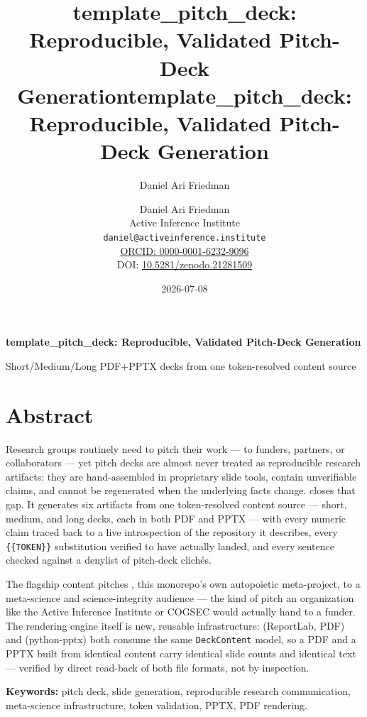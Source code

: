 \documentclass[
  english,
]{article}
\title{template\_pitch\_deck: Reproducible, Validated Pitch-Deck
Generation}
\author{Daniel Ari Friedman}
\date{}
\title{template\_pitch\_deck: Reproducible, Validated Pitch-Deck Generation}
\author{Daniel Ari Friedman\\\footnotesize{Active Inference Institute}\\\footnotesize{\texttt{daniel@activeinference.institute}}\\\footnotesize{\href{https://orcid.org/0000-0001-6232-9096}{ORCID: 0000-0001-6232-9096}} \\ \footnotesize{DOI: \href{https://doi.org/10.5281/zenodo.21281509}{10.5281/zenodo.21281509}}}
\date{2026-07-08}
\begin{document}
\begin{titlepage}
\centering
\vspace*{2cm}
{\LARGE\bfseries template\_pitch\_deck: Reproducible, Validated Pitch-Deck Generation\par}
\vspace{0.75em}
{\large Short/Medium/Long PDF+PPTX decks from one token-resolved content source\par}
\vfill
\makeatletter
{\@author\par}
\vspace{1em}
{\@date\par}
\makeatother
\vfill
\end{titlepage}
\thispagestyle{empty}
\tableofcontents
\newpage

\section{Abstract}\label{sec:abstract}

Research groups routinely need to pitch their work --- to funders,
partners, or collaborators --- yet pitch decks are almost never treated
as reproducible research artifacts: they are hand-assembled in
proprietary slide tools, contain unverifiable claims, and cannot be
regenerated when the underlying facts change.
 closes that gap. It generates six
artifacts from one token-resolved content source --- short, medium, and
long decks, each in both PDF and PPTX --- with every numeric claim
traced back to a live introspection of the repository it describes,
every \texttt{\{\{TOKEN\}\}} substitution verified to have actually
landed, and every sentence checked against a denylist of pitch-deck
clichés.

The flagship content pitches
\href{../../template_template/}{}, this
monorepo's own autopoietic meta-project, to a meta-science and
science-integrity audience --- the kind of pitch an organization like
the Active Inference Institute or COGSEC would actually hand to a
funder. The rendering engine itself is new, reusable infrastructure:
 (ReportLab, PDF) and
 (python-pptx) both
consume the same \texttt{DeckContent} model, so a PDF and a PPTX built
from identical content carry identical slide counts and identical text
--- verified by direct read-back of both file formats, not by
inspection.

\textbf{Keywords:} pitch deck, slide generation, reproducible research
communication, meta-science infrastructure, token validation, PPTX, PDF
rendering.
\end{document}
